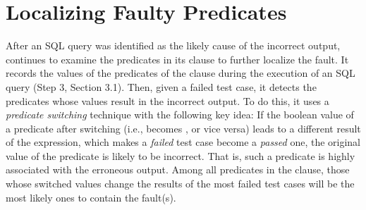 \section{Localizing Faulty Predicates}

After an SQL query was identified as the likely cause of the
incorrect output, \tool{} continues to examine the predicates in its
 clause to further localize the fault. 
It records the values of the predicates of the 
clause during the execution of an SQL query (Step 3, Section
3.1). Then, given a failed test case, it detects the predicates
whose values result in the incorrect output. To do this, it uses
a \emph{predicate switching} technique with the following key idea: If
the boolean value of a predicate after switching (i.e., 
becomes , or vice versa) leads to a different result of
the  expression, which makes a \emph{failed} test case
become a \emph{passed} one, the original value of the predicate is
likely to be incorrect. That is, such a predicate is highly
associated with the erroneous output. Among all predicates in the
 clause, those whose switched values change the results
of the most failed test cases will be the most likely ones to contain
the fault(s).



 